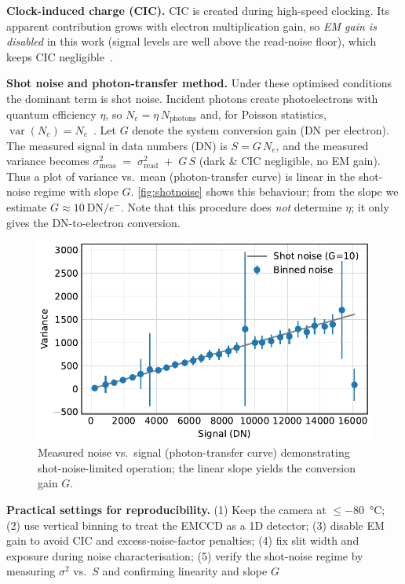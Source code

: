 \documentclass[
	parskip=half,
	a4paper,
]{scrarticle}
\begin{document}
\textbf{Clock-induced charge (CIC).}
CIC is created during high-speed clocking.
Its apparent contribution grows with electron multiplication gain, so \emph{EM gain is disabled} in this work (signal levels are well above the read-noise floor), which keeps CIC negligible~\cite{andor_establishing_nodate}.

\textbf{Shot noise and photon-transfer method.}
Under these optimised conditions the dominant term is shot noise.
Incident photons create photoelectrons with quantum efficiency \(\eta\), so \(N_e=\eta\,N_{\text{photons}}\) and, for Poisson statistics, \(\operatorname{var}(N_e)=N_e\)~\cite{european_machine_vision_association_standard_2010}.
Let \(G\) denote the system conversion gain (DN per electron). The measured signal in data numbers (DN) is \(S = G\,N_e\), and the measured variance becomes \(\sigma^2_{\text{meas}} \;=\; \sigma_{\text{read}}^2 \;+\; G\,S\) (dark \& CIC negligible, no EM gain).
Thus a plot of variance vs.\ mean (photon-transfer curve) is linear in the shot-noise regime with slope \(G\).
\autoref{fig:shotnoise} shows this behaviour; from the slope we estimate \(G \approx 10~\text{DN}/e^{-}\).
Note that this procedure does \emph{not} determine \(\eta\); it only gives the DN-to-electron conversion.

\begin{figure}
    \centering
    \includegraphics{../analysis/figures/shot noise.pdf}
    \caption{Measured noise vs.\ signal (photon-transfer curve) demonstrating shot-noise-limited operation; the linear slope yields the conversion gain \(G\).}
    \label{fig:shotnoise}
\end{figure}

\textbf{Practical settings for reproducibility.}
(1) Keep the camera at \(\leq\)\SI{-80}{\degreeCelsius}; (2) use vertical binning to treat the EMCCD as a 1D detector; (3) disable EM gain to avoid CIC and excess-noise-factor penalties; (4) fix slit width and exposure during noise characterisation; (5) verify the shot-noise regime by measuring \(\sigma^2\) vs.\ \(S\) and confirming linearity and slope \(G\)
\end{document}

